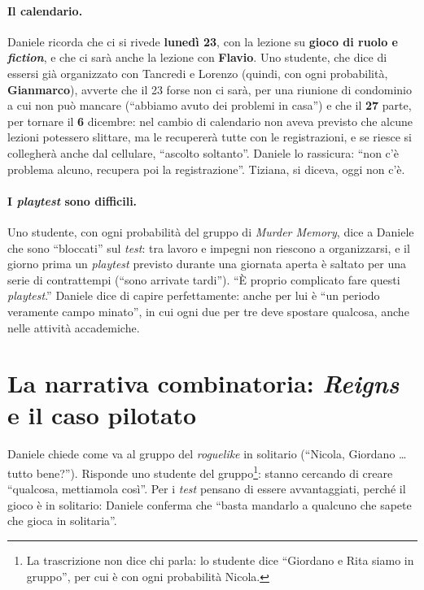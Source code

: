 \paragraph{Il calendario.} Daniele ricorda che ci si rivede \textbf{lunedì 23}, con la
lezione su \textbf{gioco di ruolo e \emph{fiction}}, e che ci sarà anche la lezione con
\textbf{Flavio}. Uno studente, che dice di essersi già organizzato con Tancredi e Lorenzo
(quindi, con ogni probabilità, \textbf{Gianmarco}), avverte che il 23 forse non ci sarà,
per una riunione di condominio a cui non può mancare (``abbiamo avuto dei problemi in
casa'') e che il \textbf{27} parte, per tornare il \textbf{6} dicembre: nel cambio di
calendario non aveva previsto che alcune lezioni potessero slittare, ma le recupererà
tutte con le registrazioni, e se riesce si collegherà anche dal cellulare, ``ascolto
soltanto''. Daniele lo rassicura: ``non c'è problema alcuno, recupera poi la
registrazione''. Tiziana, si diceva, oggi non c'è.

\paragraph{I \emph{playtest} sono difficili.} Uno studente, con ogni probabilità del
gruppo di \emph{Murder Memory}, dice a Daniele che sono ``bloccati'' sul \emph{test}:
tra lavoro e impegni non riescono a organizzarsi, e il giorno prima un \emph{playtest}
previsto durante una giornata aperta è saltato per una serie di contrattempi (``sono
arrivate tardi''). ``È proprio complicato fare questi \emph{playtest}.'' Daniele dice di
capire perfettamente: anche per lui è ``un periodo veramente campo minato'', in cui ogni
due per tre deve spostare qualcosa, anche nelle attività accademiche.

\section{La narrativa combinatoria: \emph{Reigns} e il caso pilotato}
\label{a13:sec:reigns}

Daniele chiede come va al gruppo del \emph{roguelike} in solitario (``Nicola, Giordano
\ldots{} tutto bene?''). Risponde uno studente del gruppo\footnote{La trascrizione non
dice chi parla: lo studente dice ``Giordano e Rita siamo in gruppo'', per cui è con
ogni probabilità Nicola.}: stanno cercando di creare ``qualcosa, mettiamola così''. Per i
\emph{test} pensano di essere avvantaggiati, perché il gioco è in solitario: Daniele
conferma che ``basta mandarlo a qualcuno che sapete che gioca in solitaria''.

